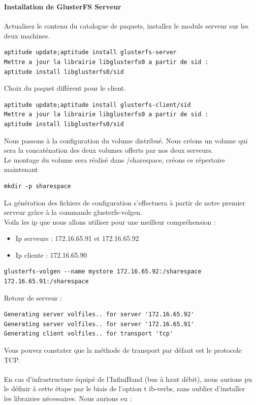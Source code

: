 \documentclass[12pt]{report}
\begin{document}
\textbf{Installation de GlusterFS Serveur}\\\\
Actualisez le contenu du catalogue de paquets, installez le module serveur sur les deux machines.
\begin{lstlisting}
aptitude update;aptitude install glusterfs-server
Mettre a jour la librairie libglusterfs0 a partir de sid : 
aptitude install libglusterfs0/sid
	  \end{lstlisting}
Choix du paquet différent pour le client.
\begin{lstlisting}
aptitude update;aptitude install glusterfs-client/sid
Mettre a jour la librairie libglusterfs0 a partir de sid : 
aptitude install libglusterfs0/sid
	  \end{lstlisting}
Nous passons à la configuration du volume distribué. Nous créons un volume qui sera la concaténation des deux volumes offerts par nos deux serveurs.\\
Le montage du volume sera réalisé dans /sharespace, créons ce répertoire maintenant\\
\begin{lstlisting}
mkdir -p sharespace
	  \end{lstlisting}
La génération des fichiers de configuration s'effectuera à partir de notre premier serveur grâce à la commande glusterfs-volgen.\\
Voila les ip que nous allons utiliser pour une meilleur compréhension :
	\begin{itemize}
		\item Ip serveurs : 172.16.65.91 et 172.16.65.92
		\item Ip cliente :  172.16.65.90\\  
	\end{itemize}
\begin{lstlisting}
glusterfs-volgen --name mystore 172.16.65.92:/sharespace 172.16.65.91:/sharespace
	  \end{lstlisting}
Retour de serveur :
\begin{lstlisting}
Generating server volfiles.. for server '172.16.65.92'
Generating server volfiles.. for server '172.16.65.91'
Generating client volfiles.. for transport 'tcp'
	  \end{lstlisting}
Vous pouvez constater que la méthode de transport par défaut est le protocole TCP.\\\\
En cas d'infrastructure équipé de l'InfiniBand (bus à haut débit), nous aurions pu le définir à cette étape par le biais de l'option t ib-verbs, sans oublier d'installer les librairies nécessaires. Nous aurions eu :\\
\end{document}
